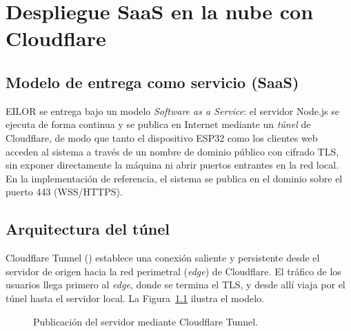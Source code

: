 \chapter{Despliegue SaaS en la nube con Cloudflare}
\label{cap:cloudflare}

\section{Modelo de entrega como servicio (SaaS)}
EILOR se entrega bajo un modelo \emph{Software as a Service}: el servidor Node.js se ejecuta de forma continua y se publica en Internet mediante un \emph{túnel} de Cloudflare, de modo que tanto el dispositivo ESP32 como los clientes web acceden al sistema a través de un nombre de dominio público con cifrado TLS, sin exponer directamente la máquina ni abrir puertos entrantes en la red local. En la implementación de referencia, el sistema se publica en el dominio  sobre el puerto 443 (WSS/HTTPS).

\section{Arquitectura del túnel}
Cloudflare Tunnel () establece una conexión saliente y persistente desde el servidor de origen hacia la red perimetral (\emph{edge}) de Cloudflare. El tráfico de los usuarios llega primero al \emph{edge}, donde se termina el TLS, y desde allí viaja por el túnel hasta el servidor local. La Figura~\ref{fig:cloudflare} ilustra el modelo.

\begin{figure}[H]
\centering
{}
\caption{Publicación del servidor mediante Cloudflare Tunnel.}
\label{fig:cloudflare}
\end{figure}

